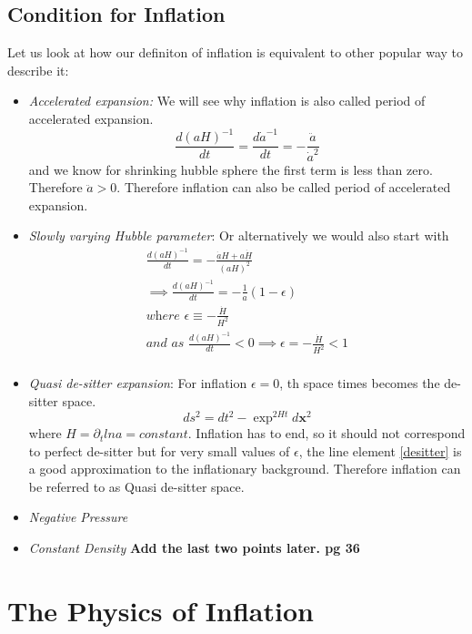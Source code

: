\documentclass[12pt]{report}
\newcommand{\mbf}[1]{\mathbf{#1}}
\newcommand{\tbf}[1]{\textbf{#1}}
\newcommand{\tit}[1]{\textit{#1}}
\newcommand{\de}[2]{\frac{d{#1}}{d{#2}}}
\newcommand{\p}{\partial}
\begin{document}
\subsection{Condition for Inflation}
Let us look at how our definiton of inflation is equivalent to other popular way to describe it:
\begin{itemize}
\item \tit{Accelerated expansion:} We will see why inflation is also called period of accelerated expansion.
\begin{equation}
\de{(aH)^{-1}}{t}=\de{\dot{a}^{-1}}{t}=-\frac{\ddot{a}}{\dot{a}^2}
\end{equation}
and we know for shrinking hubble sphere the first term is less than zero. Therefore $\ddot{a}>0$. Therefore inflation can also be called period of accelerated expansion.

\item \tit{Slowly varying Hubble parameter}:
Or alternatively we would also start with 
\begin{eqnarray*}
\de{(aH)^{-1}}{t}= -\frac{\dot{a}H+a\dot{H}}{(aH)^2}\\
\implies \de{(aH)^{-1}}{t}= -\frac{1}{a}(1-\epsilon)\\
\tit{where $\epsilon \equiv -\frac{\dot{H}}{H^2}$}\\
\tit{and as } \de{(aH)^{-1}}{t}<0 \implies \epsilon = -\frac{\dot{H}}{H^2} < 1\\
\end{eqnarray*}
\item \tit{Quasi de-sitter expansion}: For inflation $\epsilon=0$, th space times becomes the de-sitter space.
\begin{equation}\label{desitter}
ds^2=dt^2-\exp^{2Ht}d\mbf{x}^2
\end{equation}
where $H=\p_t ln a = constant$. Inflation has to end, so it should not correspond to perfect de-sitter but for very small values of $\epsilon$, the line element \eqref{desitter} is a good approximation to the inflationary background. Therefore inflation can be referred to as Quasi de-sitter space.
\item \tit{Negative Pressure} 
\item \tit{Constant Density}
\tbf{Add the last two points later. pg 36}
\end{itemize}

\newpage
\section{The Physics of Inflation}
\end{document}
